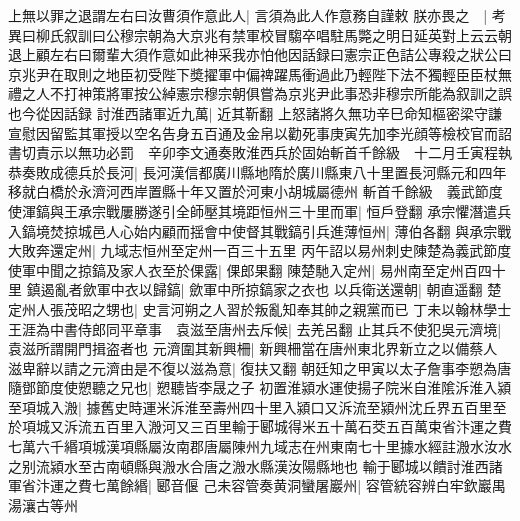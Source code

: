 上無以罪之退謂左右曰汝曹須作意此人|{
	言須為此人作意務自謹敕}
朕亦畏之　|{
	考異曰柳氏叙訓曰公穆宗朝為大京兆有禁軍校冒騶卒唱駐馬斃之明日延英對上云云朝退上顧左右曰爾輩大須作意如此神采我亦怕他因話録曰憲宗正色詰公專殺之狀公曰京兆尹在取則之地臣初受陛下奬擢軍中偏禆躍馬衝過此乃輕陛下法不獨輕臣臣杖無禮之人不打神策將軍按公綽憲宗穆宗朝俱嘗為京兆尹此事恐非穆宗所能為叙訓之誤也今從因話録}
討淮西諸軍近九萬|{
	近其靳翻}
上怒諸將久無功辛巳命知樞密梁守謙宣慰因留監其軍授以空名告身五百通及金帛以勸死事庚寅先加李光顔等檢校官而詔書切責示以無功必罰　辛卯李文通奏敗淮西兵於固始斬首千餘級　十二月壬寅程執恭奏敗成德兵於長河|{
	長河漢信都廣川縣地隋於廣川縣東八十里置長河縣元和四年移就白橋於永濟河西岸置縣十年又置於河東小胡城屬德州}
斬首千餘級　義武節度使渾鎬與王承宗戰屢勝遂引全師壓其境距恒州三十里而軍|{
	恒戶登翻}
承宗懼潛遣兵入鎬境焚掠城邑人心始内顧而揺會中使督其戰鎬引兵進薄恒州|{
	薄伯各翻}
與承宗戰大敗奔還定州|{
	九域志恒州至定州一百三十五里}
丙午詔以易州刺史陳楚為義武節度使軍中聞之掠鎬及家人衣至於倮露|{
	倮郎果翻}
陳楚馳入定州|{
	易州南至定州百四十里}
鎮遏亂者歛軍中衣以歸鎬|{
	歛軍中所掠鎬家之衣也}
以兵衛送還朝|{
	朝直遥翻}
楚定州人張茂昭之甥也|{
	史言河朔之人習於叛亂知奉其帥之親黨而已}
丁未以翰林學士王涯為中書侍郎同平章事　袁滋至唐州去斥候|{
	去羌呂翻}
止其兵不使犯吳元濟境|{
	袁滋所謂開門揖盗者也}
元濟圍其新興柵|{
	新興柵當在唐州東北界新立之以備蔡人}
滋卑辭以請之元濟由是不復以滋為意|{
	復扶又翻}
朝廷知之甲寅以太子詹事李愬為唐隨鄧節度使愬聽之兄也|{
	愬聽皆李晟之子}
初置淮潁水運使揚子院米自淮隂泝淮入潁至項城入溵|{
	據舊史時運米泝淮至壽州四十里入潁口又泝流至潁州沈丘界五百里至於項城又泝流五百里入溵河又三百里輸于郾城得米五十萬石茭五百萬束省汴運之費七萬六千緡項城漢項縣屬汝南郡唐屬陳州九域志在州東南七十里據水經註溵水汝水之别流潁水至古南頓縣與溵水合唐之溵水縣漢汝陽縣地也}
輸于郾城以饋討淮西諸軍省汴運之費七萬餘緡|{
	郾音偃}
己未容管奏黄洞蠻屠巖州|{
	容管統容辨白牢欽巖禺湯瀼古等州}


